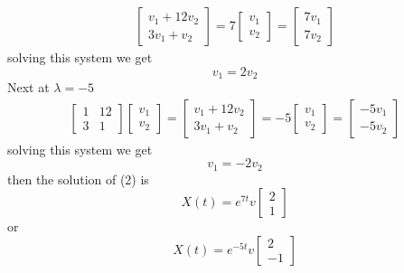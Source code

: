 \documentclass[]{article}
\begin{document}
\begin{example}
\begin{align*}
\begin{bmatrix}
        v_1 + 12v_2\\
        3v_1 + v_2 
    \end{bmatrix} 
    =
    7\begin{bmatrix}
        v_1\\v_2
    \end{bmatrix}
    =
    \begin{bmatrix}
        7v_1\\7v_2
    \end{bmatrix}
\end{align*}
solving this system we get 
\[
v_1 = 2v_2    
\]
Next at $\lambda = -5$
\begin{align*}
    \begin{bmatrix}
        1 & 12\\
        3 & 1 
    \end{bmatrix}
    \begin{bmatrix}
        v_1\\v_2
    \end{bmatrix}
    =
    \begin{bmatrix}
        v_1 + 12v_2\\
        3v_1 + v_2 
    \end{bmatrix} 
    =
    -5\begin{bmatrix}
        v_1\\v_2
    \end{bmatrix}
    =
    \begin{bmatrix}
        -5v_1\\-5v_2
    \end{bmatrix}
\end{align*}
solving this system we get 
\[
v_1 = -2v_2    
\]
then the solution of (2) is 
\[
X(t) = e^{7t}v\begin{bmatrix}
                2\\1
               \end{bmatrix}   
\]
or
\[
X(t) = e^{-5t}v\begin{bmatrix}
                2\\-1
               \end{bmatrix}   
\] 
\end{example}
\end{document}
